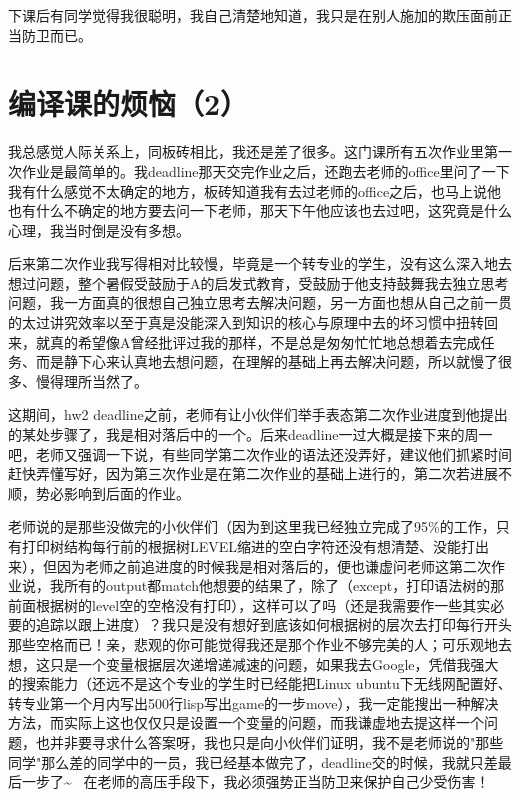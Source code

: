 \documentclass[12pt]{book}
\begin{document}
下课后有同学觉得我很聪明，我自己清楚地知道，我只是在别人施加的欺压面前正当防卫而已。

\section{编译课的烦恼（2）}
\label{sec-24-2}

我总感觉人际关系上，同板砖相比，我还是差了很多。这门课所有五次作业里第一次作业是最简单的。我deadline那天交完作业之后，还跑去老师的office里问了一下我有什么感觉不太确定的地方，板砖知道我有去过老师的office之后，也马上说他也有什么不确定的地方要去问一下老师，那天下午他应该也去过吧，这究竟是什么心理，我当时倒是没有多想。

后来第二次作业我写得相对比较慢，毕竟是一个转专业的学生，没有这么深入地去想过问题，整个暑假受鼓励于A的启发式教育，受鼓励于他支持鼓舞我去独立思考问题，我一方面真的很想自己独立思考去解决问题，另一方面也想从自己之前一贯的太过讲究效率以至于真是没能深入到知识的核心与原理中去的坏习惯中扭转回来，就真的希望像A曾经批评过我的那样，不是总是匆匆忙忙地总想着去完成任务、而是静下心来认真地去想问题，在理解的基础上再去解决问题，所以就慢了很多、慢得理所当然了。

这期间，hw2 deadline之前，老师有让小伙伴们举手表态第二次作业进度到他提出的某处步骤了，我是相对落后中的一个。后来deadline一过大概是接下来的周一吧，老师又强调一下说，有些同学第二次作业的语法还没弄好，建议他们抓紧时间赶快弄懂写好，因为第三次作业是在第二次作业的基础上进行的，第二次若进展不顺，势必影响到后面的作业。

老师说的是那些没做完的小伙伴们（因为到这里我已经独立完成了95\%的工作，只有打印树结构每行前的根据树LEVEL缩进的空白字符还没有想清楚、没能打出来），但因为老师之前追进度的时候我是相对落后的，便也谦虚问老师这第二次作业说，我所有的output都match他想要的结果了，除了（except，打印语法树的那前面根据树的level空的空格没有打印），这样可以了吗（还是我需要作一些其实必要的追踪以跟上进度）？我只是没有想好到底该如何根据树的层次去打印每行开头那些空格而已！亲，悲观的你可能觉得我还是那个作业不够完美的人；可乐观地去想，这只是一个变量根据层次递增递减速的问题，如果我去Google，凭借我强大的搜索能力（还远不是这个专业的学生时已经能把Linux ubuntu下无线网配置好、转专业第一个月内写出500行lisp写出game的一步move），我一定能搜出一种解决方法，而实际上这也仅仅只是设置一个变量的问题，而我谦虚地去提这样一个问题，也并非要寻求什么答案呀，我也只是向小伙伴们证明，我不是老师说的"那些同学"那么差的同学中的一员，我已经基本做完了，deadline交的时候，我就只差最后一步了\textasciitilde{}~ 在老师的高压手段下，我必须强势正当防卫来保护自己少受伤害！
\end{document}
